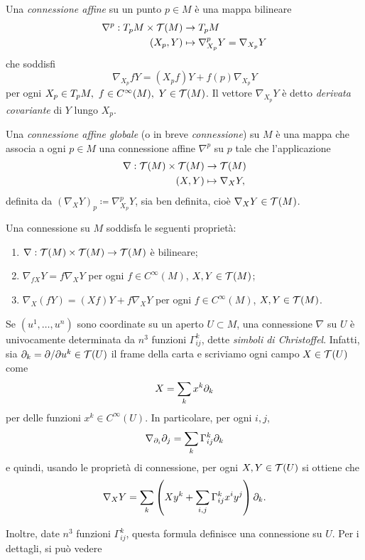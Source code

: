 	\begin{defi}
		Una \textit{connessione affine} su un punto \(p \in M\) è una mappa bilineare
		\begin{align*}
			\nabla^p:T_pM \times \mathcal{T}(M) &\to T_pM \\
			(X_p,Y) &\mapsto \nabla^p_{X_p}Y = \nabla_{X_p}Y
		\end{align*}
		che soddisfi
		\[
		\nabla_{X_p} fY = (X_pf) Y + f(p)\nabla_{X_p}Y 
		\]
		per ogni \(X_p \in T_pM, \ f \in C^\infty(M), \ Y \in \T(M)\). Il vettore \(\nabla_{X_p}Y\) è detto \textit{derivata covariante} di \(Y\) lungo \(X_p\).
		
		Una \textit{connessione affine globale} (o in breve \textit{connessione}) su \(M\) è una mappa che associa a ogni \(p \in M\) una connessione affine \(\nabla^p\) su \(p\) tale che l'applicazione
		\begin{align*}
			\nabla: \mathcal{T}(M) \times \mathcal{T}(M) &\to \mathcal{T}(M)\\
			(X,Y) &\mapsto \nabla_X Y,
		\end{align*}
		definita da \((\nabla_XY)_p \coloneq \nabla^p_{X_p}Y\), sia ben definita, cioè \(\nabla_X Y \in \mathcal{T}(M)\).
	\end{defi}
	\begin{oss}
		Una connessione su \(M\) soddisfa le seguenti proprietà:
		\begin{enumerate}[label=(\roman*)]
			\item \(\nabla:\mathcal{T}(M) \times \mathcal{T}(M) \to \mathcal{T}(M)\) è bilineare;
			\item \(\nabla_{fX}Y = f \nabla_XY\) per ogni \(f \in C^\infty(M)\), \(X,Y \in \mathcal{T}(M)\);
			\item \(\nabla_X(fY)= (Xf)Y+f\nabla_XY\) per ogni \(f \in C^\infty(M)\), \(X,Y \in \mathcal{T}(M)\).
		\end{enumerate}
		
		Se \((u^1,\dots , u^n)\) sono coordinate su un aperto \(U \subset M\), una connessione \(\nabla\) su \(U\) è univocamente determinata da \(n^3\) funzioni \(\Gamma_{ij}^k\), dette \textit{simboli di Christoffel}. Infatti, sia \(\partial_k = \partial/\partial u^k \in \mathcal{T}(U)\) il frame della carta e scriviamo ogni campo \(X \in \mathcal{T}(U)\) come
		\[
		X= \sum_k  x^k \partial_k
		\]
		per delle funzioni \(x^k \in C^\infty(U)\). In particolare, per ogni \(i,j\),
		\[
		\nabla_{\partial_i} \partial_j = \sum_k \Gamma_{ij}^k\partial_k
		\]
		e quindi, usando le proprietà di connessione, per ogni \(X,Y \in \mathcal{T}(U)\) si ottiene che
		\begin{equation*}
			\nabla_X Y = \sum_{k}\left(Xy^k+\sum_{i,j}\Gamma_{ij}^kx^iy^j\right) \partial_k.
		\end{equation*}
		
		Inoltre, date \(n^3\) funzioni \(\Gamma^k_{ij}\), questa formula definisce una connessione su \(U\). Per i dettagli, si può vedere \cite[Osservazione~6.1.9]{abate2011geometria}
	\end{oss}
	
